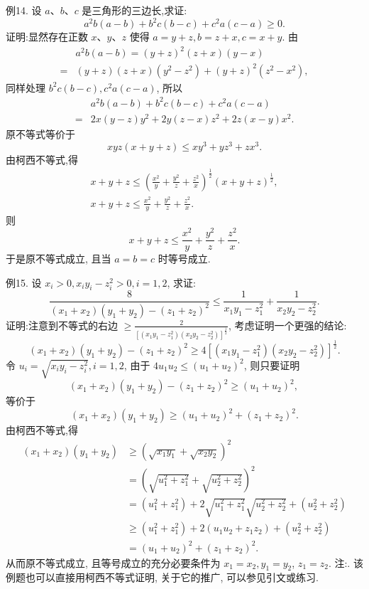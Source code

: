 例14. 设 $a 、 b 、 c$ 是三角形的三边长,求证:
$$
a^2 b(a-b)+b^2 c(b-c)+c^2 a(c-a) \geqslant 0 .
$$
证明:显然存在正数 $x 、 y 、 z$ 使得 $a=y+z, b=z+x, c=x+y$. 由
$$
\begin{aligned}
& a^2 b(a-b)=(y+z)^2(z+x)(y-x) \\
= & (y+z)(z+x)\left(y^2-z^2\right)+(y+z)^2\left(z^2-x^2\right),
\end{aligned}
$$
同样处理 $b^2 c(b-c), c^2 a(c-a)$, 所以
$$
\begin{aligned}
& a^2 b(a-b)+b^2 c(b-c)+c^2 a(c-a) \\
= & 2 x(y-z) y^2+2 y(z-x) z^2+2 z(x-y) x^2 .
\end{aligned}
$$
原不等式等价于
$$
x y z(x+y+z) \leqslant x y^3+y z^3+z x^3 .
$$
由柯西不等式,得
$$
\begin{gathered}
x+y+z \leqslant\left(\frac{x^2}{y}+\frac{y^2}{z}+\frac{z^2}{x}\right)^{\frac{1}{2}}(x+y+z)^{\frac{1}{2}}, \\
x+y+z \leqslant \frac{x^2}{y}+\frac{y^2}{z}+\frac{z^2}{x} .
\end{gathered}
$$
则
$$
x+y+z \leqslant \frac{x^2}{y}+\frac{y^2}{z}+\frac{z^2}{x} .
$$
于是原不等式成立, 且当 $a=b=c$ 时等号成立.



例15. 设 $x_i>0, x_i y_i-z_i^2>0, i=1,2$, 求证:
$$
\frac{8}{\left(x_1+x_2\right)\left(y_1+y_2\right)-\left(z_1+z_2\right)^2} \leqslant \frac{1}{x_1 y_1-z_1^2}+\frac{1}{x_2 y_2-z_2^2} .
$$
证明:注意到不等式的右边 $\geqslant \frac{2}{\left[\left(x_1 y_1-z_1^2\right)\left(x_2 y_2-z_2^2\right)\right]^{\frac{1}{2}}}$, 考虑证明一个更强的结论:
$$
\left(x_1+x_2\right)\left(y_1+y_2\right)-\left(z_1+z_2\right)^2 \geqslant 4\left[\left(x_1 y_1-z_1^2\right)\left(x_2 y_2-z_2^2\right)\right]^{\frac{1}{2}} .
$$
令 $u_i=\sqrt{x_i y_i-z_i^2}, i=1,2$, 由于 $4 u_1 u_2 \leqslant\left(u_1+u_2\right)^2$, 则只要证明
$$
\left(x_1+x_2\right)\left(y_1+y_2\right)-\left(z_1+z_2\right)^2 \geqslant\left(u_1+u_2\right)^2 \text {, }
$$
等价于
$$
\left(x_1+x_2\right)\left(y_1+y_2\right) \geqslant\left(u_1+u_2\right)^2+\left(z_1+z_2\right)^2 .
$$
由柯西不等式,得
$$
\begin{aligned}
\left(x_1+x_2\right)\left(y_1+y_2\right) & \geqslant\left(\sqrt{x_1 y_1}+\sqrt{x_2 y_2}\right)^2 \\
& =\left(\sqrt{u_1^2+z_1^2}+\sqrt{u_2^2+z_2^2}\right)^2 \\
& =\left(u_1^2+z_1^2\right)+2 \sqrt{u_1^2+z_1^2} \sqrt{u_2^2+z_2^2}+\left(u_2^2+z_2^2\right) \\
& \geqslant\left(u_1^2+z_1^2\right)+2\left(u_1 u_2+z_1 z_2\right)+\left(u_2^2+z_2^2\right) \\
& =\left(u_1+u_2\right)^2+\left(z_1+z_2\right)^2 .
\end{aligned}
$$
从而原不等式成立, 且等号成立的充分必要条件为 $x_1=x_2, y_1=y_2$, $z_1=z_2$.
注:.
该例题也可以直接用柯西不等式证明, 关于它的推广, 可以参见引文或练习.




